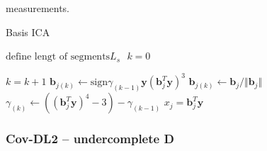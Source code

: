 measurements. 
\begin{algorithm}[H]
\caption{Basis ICA}
\begin{algorithmic}[1]
			\State $\text{define lengt of segments} L_s$
			\State $ $
			\EndProcedure  
			\State
			\State$k=0$            
            
            
               		\State $k = k+1$
                	\State $\textbf{b}_{j(k)} \gets \text{sign}\gamma_{(k-1)} \textbf{y}(\textbf{b}_{j}^T \textbf{y})^3$
                	\State $\textbf{b}_{j(k)} \gets \textbf{b}_j/\Vert \textbf{b}_j \Vert $ 
                	\State $\gamma_{(k)} \gets ((\textbf{b}_{j}^T \textbf{y})^4 - 3) - \gamma_{(k-1)} $
          		\EndWhile
          		\State $x_{j} = \textbf{b}_{j}^T\textbf{y}$
          	\EndFor
          	
            \EndProcedure
        \end{algorithmic} 
        \label{alg:basicICA}
\end{algorithm}

\subsubsection*{Cov-DL2 -- undercomplete \textbf{D}}



